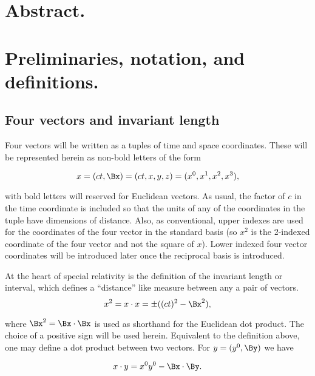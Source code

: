 \documentclass[iop,onecolumn]{emulateapj}
\begin{document}
\section{Abstract.}


\section{Preliminaries, notation, and definitions.}

\subsection{Four vectors and invariant length}

Four vectors will be written as a tuples of time and space coordinates.  These will be represented herein as non-bold letters of the form

\begin{equation}\label{eqn:grahamSchmidtLorentz:10}
x = (c t, \Bx) = ( c t, x, y, z ) = ( x^0, x^1, x^2, x^3 ),
\end{equation}

with bold letters will reserved for Euclidean vectors.  As usual, the factor of $c$ in the time coordinate is included so that the units of any of the coordinates in the tuple have dimensions of distance.  Also, as conventional, upper indexes are used for the coordinates of the four vector in the standard basis (so $x^2$ is the 2-indexed coordinate of the four vector and not the square of $x$).  Lower indexed four vector coordinates will be introduced later once the reciprocal basis is introduced.

At the heart of special relativity is the definition of the invariant length or interval, which defines a ``distance'' like measure between any a pair of vectors.
%
%
\begin{equation}\label{eqn:grahamSchmidtLorentz:30}
x^2 = x \cdot x = \pm ((c t)^2 - \Bx^2),
\end{equation}

where $\Bx^2 = \Bx \cdot \Bx$ is used as shorthand for the Euclidean dot product.  The choice of a positive sign will be used herein.  Equivalent to the definition above, one may define a dot product between two vectors.  For $y = (y^0, \By)$ we have

\begin{equation}\label{eqn:grahamSchmidtLorentz:50}
x \cdot y = x^0 y^0 - \Bx \cdot \By.
\end{equation}
\end{document}
